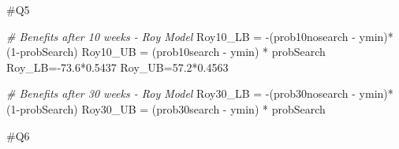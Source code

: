 \documentclass[
]{article}
\newenvironment{Shaded}{\begin{snugshade}}{\end{snugshade}}
\newcommand{\CommentTok}[1]{\textcolor[rgb]{0.56,0.35,0.01}{\textit{#1}}}
\newcommand{\DecValTok}[1]{\textcolor[rgb]{0.00,0.00,0.81}{#1}}
\newcommand{\FloatTok}[1]{\textcolor[rgb]{0.00,0.00,0.81}{#1}}
\newcommand{\NormalTok}[1]{#1}
\newcommand{\OtherTok}[1]{\textcolor[rgb]{0.56,0.35,0.01}{#1}}
\newcommand{\SpecialCharTok}[1]{\textcolor[rgb]{0.00,0.00,0.00}{#1}}
\begin{document}
\#Q5

\begin{Shaded}
\begin{Highlighting}[]
\CommentTok{\# Benefits after 10 weeks {-} Roy Model}
\NormalTok{Roy10\_LB }\OtherTok{=} \SpecialCharTok{{-}}\NormalTok{(prob10nosearch }\SpecialCharTok{{-}}\NormalTok{ ymin)}\SpecialCharTok{*}\NormalTok{ (}\DecValTok{1}\SpecialCharTok{{-}}\NormalTok{probSearch)}
\NormalTok{Roy10\_UB }\OtherTok{=}\NormalTok{  (prob10search }\SpecialCharTok{{-}}\NormalTok{ ymin) }\SpecialCharTok{*}\NormalTok{ probSearch}
\NormalTok{Roy\_LB}\OtherTok{=}\SpecialCharTok{{-}}\FloatTok{73.6}\SpecialCharTok{*}\FloatTok{0.5437}
\NormalTok{Roy\_UB}\OtherTok{=}\FloatTok{57.2}\SpecialCharTok{*}\FloatTok{0.4563}

\CommentTok{\# Benefits after 30 weeks {-} Roy Model}
\NormalTok{Roy30\_LB }\OtherTok{=} \SpecialCharTok{{-}}\NormalTok{(prob30nosearch }\SpecialCharTok{{-}}\NormalTok{ ymin)}\SpecialCharTok{*}\NormalTok{ (}\DecValTok{1}\SpecialCharTok{{-}}\NormalTok{probSearch)}
\NormalTok{Roy30\_UB }\OtherTok{=}\NormalTok{  (prob30search }\SpecialCharTok{{-}}\NormalTok{ ymin) }\SpecialCharTok{*}\NormalTok{ probSearch}
\end{Highlighting}
\end{Shaded}

\#Q6
\end{document}
